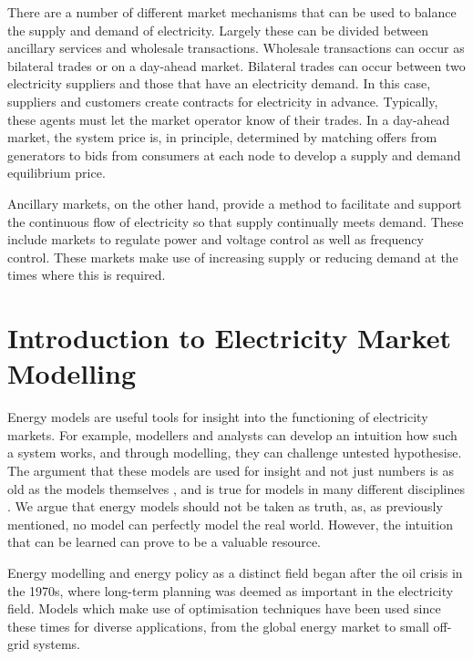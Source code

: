 There are a number of different market mechanisms that can be used to balance the supply and demand of electricity. Largely these can be divided between ancillary services and wholesale transactions. Wholesale transactions can occur as bilateral trades or on a day-ahead market. Bilateral trades can occur between two electricity suppliers and those that have an electricity demand. In this case, suppliers and customers create contracts for electricity in advance. Typically, these agents must let the market operator know of their trades. In a day-ahead market, the system price is, in principle, determined by matching offers from generators to bids from consumers at each node to develop a supply and demand equilibrium price. 

Ancillary markets, on the other hand, provide a method to facilitate and support the continuous flow of electricity so that supply continually meets demand. These include markets to regulate power and voltage control as well as frequency control. These markets make use of increasing supply or reducing demand at the times where this is required. 







\section{Introduction to Electricity Market Modelling}
\label{sec:intro:elecmarketsmodelling}


Energy models are useful tools for insight into the functioning of electricity markets. For example, modellers and analysts can develop an intuition how such a system works, and through modelling, they can challenge untested hypothesise. The argument that these models are used for insight and not just numbers is as old as the models themselves \cite{Huntington1982, Pfenninger2014b}, and is true for models in many different disciplines \cite{Geoffrion1976}. We argue that energy models should not be taken as truth, as, as previously mentioned, no model can perfectly model the real world. However, the intuition that can be learned can prove to be a valuable resource.

Energy modelling and energy policy as a distinct field began after the oil crisis in the 1970s, where long-term planning was deemed as important in the electricity field. Models which make use of optimisation techniques have been used since these times for diverse applications, from the global energy market to small off-grid systems.

